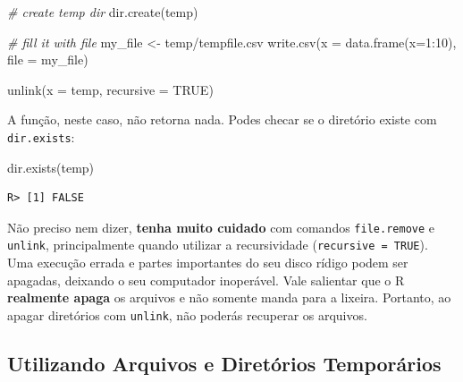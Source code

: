 \documentclass[
  11pt,
]{book}
\newenvironment{Shaded}{\begin{snugshade}}{\end{snugshade}}
\newcommand{\AttributeTok}[1]{\textcolor[rgb]{0.61,0.61,0.61}{#1}}
\newcommand{\CommentTok}[1]{\textcolor[rgb]{0.37,0.37,0.37}{\textit{#1}}}
\newcommand{\ConstantTok}[1]{\textcolor[rgb]{0,0,0}{#1}}
\newcommand{\DecValTok}[1]{\textcolor[rgb]{0.06,0.06,0.06}{#1}}
\newcommand{\FunctionTok}[1]{\textcolor[rgb]{0,0,0}{#1}}
\newcommand{\NormalTok}[1]{#1}
\newcommand{\OtherTok}[1]{\textcolor[rgb]{0.37,0.37,0.37}{#1}}
\newcommand{\SpecialCharTok}[1]{\textcolor[rgb]{0,0,0}{#1}}
\newcommand{\StringTok}[1]{\textcolor[rgb]{0.5,0.5,0.5}{#1}}
\newenvironment{rmdcaution}
{\begin{cautionblock}

} {\end{cautionblock}}
\begin{document}
\begin{Shaded}
\begin{Highlighting}[]
\CommentTok{\# create temp dir}
\FunctionTok{dir.create}\NormalTok{(}\StringTok{\textquotesingle{}temp\textquotesingle{}}\NormalTok{)}

\CommentTok{\# fill it with file}
\NormalTok{my\_file }\OtherTok{\textless{}{-}} \StringTok{\textquotesingle{}temp/tempfile.csv\textquotesingle{}}
\FunctionTok{write.csv}\NormalTok{(}\AttributeTok{x =} \FunctionTok{data.frame}\NormalTok{(}\AttributeTok{x=}\DecValTok{1}\SpecialCharTok{:}\DecValTok{10}\NormalTok{),}
          \AttributeTok{file =}\NormalTok{ my\_file)}

\FunctionTok{unlink}\NormalTok{(}\AttributeTok{x =} \StringTok{\textquotesingle{}temp\textquotesingle{}}\NormalTok{, }\AttributeTok{recursive =} \ConstantTok{TRUE}\NormalTok{)}
\end{Highlighting}
\end{Shaded}

A função, neste caso, não retorna nada. Podes checar se o diretório existe com \texttt{dir.exists}:

\begin{Shaded}
\begin{Highlighting}[]
\FunctionTok{dir.exists}\NormalTok{(}\StringTok{\textquotesingle{}temp\textquotesingle{}}\NormalTok{)}
\end{Highlighting}
\end{Shaded}

\begin{verbatim}
R> [1] FALSE
\end{verbatim}

\begin{rmdcaution}
Não preciso nem dizer, \textbf{tenha muito cuidado} com comandos
\texttt{file.remove} e \texttt{unlink}, principalmente quando utilizar a
recursividade (\texttt{recursive\ =\ TRUE}). Uma execução errada e
partes importantes do seu disco rídigo podem ser apagadas, deixando o
seu computador inoperável. Vale salientar que o R \textbf{realmente
apaga} os arquivos e não somente manda para a lixeira. Portanto, ao
apagar diretórios com \texttt{unlink}, não poderás recuperar os
arquivos.
\end{rmdcaution}

\hypertarget{utilizando-arquivos-e-diretuxf3rios-temporuxe1rios}{%
\subsection{Utilizando Arquivos e Diretórios Temporários}\label{utilizando-arquivos-e-diretuxf3rios-temporuxe1rios}}
\end{document}
